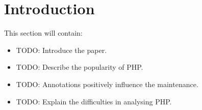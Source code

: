 \documentclass[../main.tex]{subfiles}
\begin{document}
    \section{Introduction}\label{sec:introduction}
    This section will contain:
    \begin{itemize}
        \item TODO: Introduce the paper.
        \item TODO: Describe the popularity of PHP.
        \item TODO: Annotations positively influence the maintenance.
        \item TODO: Explain the difficulties in analysing PHP.
    \end{itemize}
\end{document}
